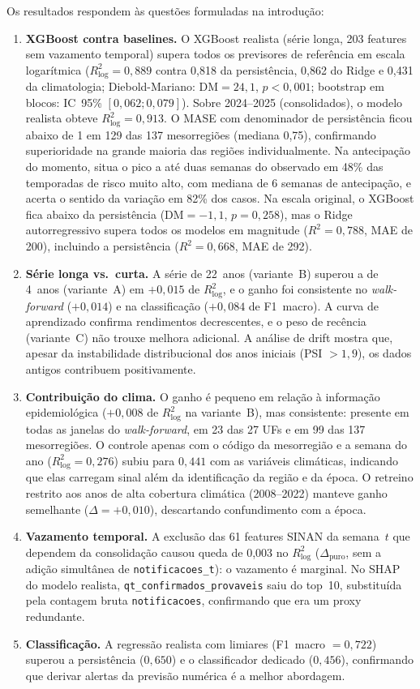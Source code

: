 Os resultados respondem às questões formuladas na introdução:

\begin{enumerate}
    \item \textbf{XGBoost contra baselines.} O XGBoost realista (série longa, 203 features sem vazamento temporal) supera todos os previsores de referência em escala logarítmica ($R^2_{\log}=0{,}889$ contra 0,818 da persistência, 0,862 do Ridge e 0,431 da climatologia; Diebold-Mariano: $\mathrm{DM}=24{,}1$, $p < 0{,}001$; bootstrap em blocos: IC~95\% $[0{,}062; 0{,}079]$). Sobre 2024--2025 (consolidados), o modelo realista obteve $R^2_{\log}=0{,}913$. O MASE com denominador de persistência ficou abaixo de 1 em 129 das 137 mesorregiões (mediana 0,75), confirmando superioridade na grande maioria das regiões individualmente. Na antecipação do momento, situa o pico a até duas semanas do observado em 48\% das temporadas de risco muito alto, com mediana de 6 semanas de antecipação, e acerta o sentido da variação em 82\% dos casos. Na escala original, o XGBoost fica abaixo da persistência ($\mathrm{DM}=-1{,}1$, $p=0{,}258$), mas o Ridge autorregressivo supera todos os modelos em magnitude ($R^2=0{,}788$, MAE de 200), incluindo a persistência ($R^2=0{,}668$, MAE de 292).
    \item \textbf{Série longa vs.\ curta.} A série de 22~anos (variante~B) superou a de 4~anos (variante~A) em $+0{,}015$ de $R^2_{\log}$, e o ganho foi consistente no \textit{walk-forward} ($+0{,}014$) e na classificação ($+0{,}084$ de F1~macro). A curva de aprendizado confirma rendimentos decrescentes, e o peso de recência (variante~C) não trouxe melhora adicional. A análise de drift mostra que, apesar da instabilidade distribucional dos anos iniciais (PSI $> 1{,}9$), os dados antigos contribuem positivamente.
    \item \textbf{Contribuição do clima.} O ganho é pequeno em relação à informação epidemiológica ($+0{,}008$ de $R^2_{\log}$ na variante~B), mas consistente: presente em todas as janelas do \textit{walk-forward}, em 23 das 27 UFs e em 99 das 137 mesorregiões. O controle apenas com o código da mesorregião e a semana do ano ($R^2_{\log}=0{,}276$) subiu para $0{,}441$ com as variáveis climáticas, indicando que elas carregam sinal além da identificação da região e da época. O retreino restrito aos anos de alta cobertura climática (2008--2022) manteve ganho semelhante ($\Delta=+0{,}010$), descartando confundimento com a época.
    \item \textbf{Vazamento temporal.} A exclusão das 61 features SINAN da semana~$t$ que dependem da consolidação causou queda de 0,003 no $R^2_{\log}$ ($\Delta_{\mathrm{puro}}$, sem a adição simultânea de \texttt{notificacoes\_t}): o vazamento é marginal. No SHAP do modelo realista, \texttt{qt\_confirmados\_provaveis} saiu do top~10, substituída pela contagem bruta \texttt{notificacoes}, confirmando que era um proxy redundante.
    \item \textbf{Classificação.} A regressão realista com limiares (F1~macro $=0{,}722$) superou a persistência ($0{,}650$) e o classificador dedicado ($0{,}456$), confirmando que derivar alertas da previsão numérica é a melhor abordagem.
\end{enumerate}
